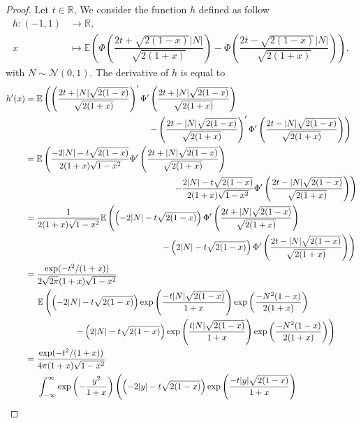 \documentclass[12pt]{article}
\theoremstyle{Theorem}
\theoremstyle{definition}
\begin{document}
\begin{proof}
Let $t \in \mathbb{R}$, We consider the function $h$ defined as follow \begin{align*} 
h: (-1,1) &\longrightarrow \mathbb{R}, \\
x & \longmapsto \mathbb{E}\left(\Phi\left(\dfrac{2t + \sqrt{2(1-x)}|N|}{\sqrt{2(1+x)}}\right) - \Phi\left(\dfrac{2t - \sqrt{2(1-x)}|N|}{\sqrt{2(1+x)}}\right)\right),
\end{align*}
with $N \sim \mathcal{N}\left(0,1\right)$. The derivative of $h$ is equal to 
\begin{align*}
h'(x) & = \mathbb{E}\left( \left(\frac{2t + |N|\sqrt{2(1-x)}}{\sqrt{2(1+x)}}\right)'\Phi'\left(\frac{2t + |N|\sqrt{2(1-x)}}{\sqrt{2(1+x)}}\right)\right. \\
& \hspace{5cm} \left. - \left(\frac{2t - |N|\sqrt{2(1-x)}}{\sqrt{2(1+x)}}\right)'\Phi'\left(\frac{2t - |N|\sqrt{2(1-x)}}{\sqrt{2(1+x)}}\right) \right)\\
& = \mathbb{E}\left(\frac{-2|N| -t\sqrt{2(1-x)}}{2(1+x)\sqrt{1-x^2}}\Phi'\left(\frac{2t + |N|\sqrt{2(1-x)}}{\sqrt{2(1+x)}}\right) \right. \\
& \hspace{6cm}  \left. - \frac{2|N| - t\sqrt{2(1-x)}}{2(1+x)\sqrt{1-x^2}}\Phi'\left(\frac{2t - |N|\sqrt{2(1-x)}}{\sqrt{2(1+x)}}\right) \right) \\
& = \frac{1}{2(1+x)\sqrt{1-x^2}}\mathbb{E}\left(\left(-2|N| -t\sqrt{2(1-x)}\right)\Phi'\left(\frac{2t + |N|\sqrt{2(1-x)}}{\sqrt{2(1+x)}}\right) \right. \\
& \hspace{5.5cm}  \left. - \left(2|N| - t\sqrt{2(1-x)}\right)\Phi'\left(\frac{2t - |N|\sqrt{2(1-x)}}{\sqrt{2(1+x)}}\right) \right) \\
& = \frac{\exp(-t^2/(1+x))}{2\sqrt{2\pi}(1+x)\sqrt{1-x^2}}\\
&\hspace{0.5cm} \mathbb{E}\left(\left(-2|N| -t\sqrt{2(1-x)}\right)\exp\left(\frac{-t|N|\sqrt{2(1-x)}}{1+x}\right)\exp\left(\frac{-N^{2}(1-x)}{2(1+x)}\right)\right. \\
&\hspace{2cm}\left. - \left(2|N| - t\sqrt{2(1-x)}\right)\exp\left(\frac{t|N|\sqrt{2(1-x)}}{1+x}\right)\exp\left(\frac{-N^{2}(1-x)}{2(1+x)}\right)\right) \\
& = \frac{\exp(-t^2/(1+x))}{4\pi(1+x)\sqrt{1-x^2}}\\
&\hspace{0.5cm} \int_{-\infty}^{\infty}\exp\left(-\frac{y^2}{1+x}\right)\left(\left(-2|y| -t\sqrt{2(1-x)}\right)\exp\left(\frac{-t|y|\sqrt{2(1-x)}}{1+x}\right)\right. \\

\end{align*}
\end{proof}
\end{document}
